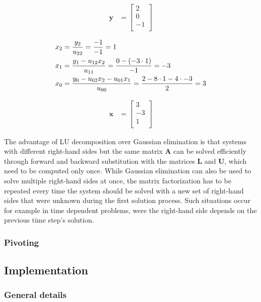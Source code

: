 \begin{align*}
\mathbf{y} 
& =
\begin{bmatrix}
2\\
0\\
-1\\
\end{bmatrix}
\end{align*}

\begin{align*}
x_2 &= \frac{y_2}{u_{22}} = \frac{-1}{-1}= 1\\
x_1 &= \frac{y_1 - u_{12}x_2}{u_{11}} = \frac{0 - \left(-3 \cdot 1\right)}{-1} = -3\\
x_0 &= \frac{y_0 - u_{02}x_2 - u_{01}x_1}{u_{00}} = \frac{2 - 8 \cdot 1 - 4 \cdot -3}{2} =  3
\end{align*}

\begin{align*}
\mathbf{x} 
& =
\begin{bmatrix}
3\\
-3\\
1\\
\end{bmatrix}
\end{align*}

The advantage of LU decomposition over Gaussian elimination is that systems with different right-hand sides but the same matrix $\mathbf{A}$ can be solved efficiently through forward and backward substitution with the matrices $\mathbf{L}$ and $\mathbf{U}$, which need to be computed only once. 
While Gaussian elimination can also be used to solve multiple right-hand sides at once, the matrix factorization has to be repeated every time the system should be solved with a new set of right-hand sides that were unknown during the first solution process.
Such situations occur for example in time dependent problems, were the right-hand side depends on the previous time step's solution.

\subsubsection{Pivoting}



\subsection{Implementation}

\subsubsection{General details}

